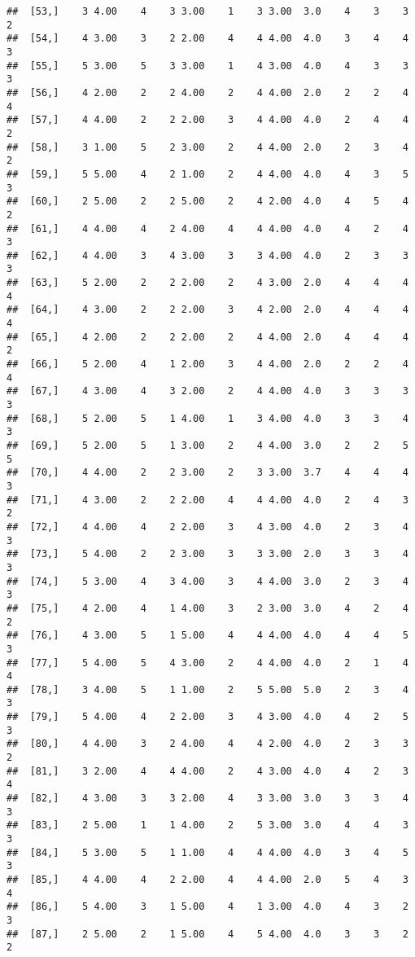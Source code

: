 \documentclass[]{article}
\begin{document}
\begin{verbatim}
##  [53,]    3 4.00    4    3 3.00    1    3 3.00  3.0    4    3    3    2
##  [54,]    4 3.00    3    2 2.00    4    4 4.00  4.0    3    4    4    3
##  [55,]    5 3.00    5    3 3.00    1    4 3.00  4.0    4    3    3    3
##  [56,]    4 2.00    2    2 4.00    2    4 4.00  2.0    2    2    4    4
##  [57,]    4 4.00    2    2 2.00    3    4 4.00  4.0    2    4    4    2
##  [58,]    3 1.00    5    2 3.00    2    4 4.00  2.0    2    3    4    2
##  [59,]    5 5.00    4    2 1.00    2    4 4.00  4.0    4    3    5    3
##  [60,]    2 5.00    2    2 5.00    2    4 2.00  4.0    4    5    4    2
##  [61,]    4 4.00    4    2 4.00    4    4 4.00  4.0    4    2    4    3
##  [62,]    4 4.00    3    4 3.00    3    3 4.00  4.0    2    3    3    3
##  [63,]    5 2.00    2    2 2.00    2    4 3.00  2.0    4    4    4    4
##  [64,]    4 3.00    2    2 2.00    3    4 2.00  2.0    4    4    4    4
##  [65,]    4 2.00    2    2 2.00    2    4 4.00  2.0    4    4    4    2
##  [66,]    5 2.00    4    1 2.00    3    4 4.00  2.0    2    2    4    4
##  [67,]    4 3.00    4    3 2.00    2    4 4.00  4.0    3    3    3    3
##  [68,]    5 2.00    5    1 4.00    1    3 4.00  4.0    3    3    4    3
##  [69,]    5 2.00    5    1 3.00    2    4 4.00  3.0    2    2    5    5
##  [70,]    4 4.00    2    2 3.00    2    3 3.00  3.7    4    4    4    3
##  [71,]    4 3.00    2    2 2.00    4    4 4.00  4.0    2    4    3    2
##  [72,]    4 4.00    4    2 2.00    3    4 3.00  4.0    2    3    4    3
##  [73,]    5 4.00    2    2 3.00    3    3 3.00  2.0    3    3    4    3
##  [74,]    5 3.00    4    3 4.00    3    4 4.00  3.0    2    3    4    3
##  [75,]    4 2.00    4    1 4.00    3    2 3.00  3.0    4    2    4    2
##  [76,]    4 3.00    5    1 5.00    4    4 4.00  4.0    4    4    5    3
##  [77,]    5 4.00    5    4 3.00    2    4 4.00  4.0    2    1    4    4
##  [78,]    3 4.00    5    1 1.00    2    5 5.00  5.0    2    3    4    3
##  [79,]    5 4.00    4    2 2.00    3    4 3.00  4.0    4    2    5    3
##  [80,]    4 4.00    3    2 4.00    4    4 2.00  4.0    2    3    3    2
##  [81,]    3 2.00    4    4 4.00    2    4 3.00  4.0    4    2    3    4
##  [82,]    4 3.00    3    3 2.00    4    3 3.00  3.0    3    3    4    3
##  [83,]    2 5.00    1    1 4.00    2    5 3.00  3.0    4    4    3    3
##  [84,]    5 3.00    5    1 1.00    4    4 4.00  4.0    3    4    5    3
##  [85,]    4 4.00    4    2 2.00    4    4 4.00  2.0    5    4    3    4
##  [86,]    5 4.00    3    1 5.00    4    1 3.00  4.0    4    3    2    3
##  [87,]    2 5.00    2    1 5.00    4    5 4.00  4.0    3    3    2    2

\end{verbatim}
\end{document}
